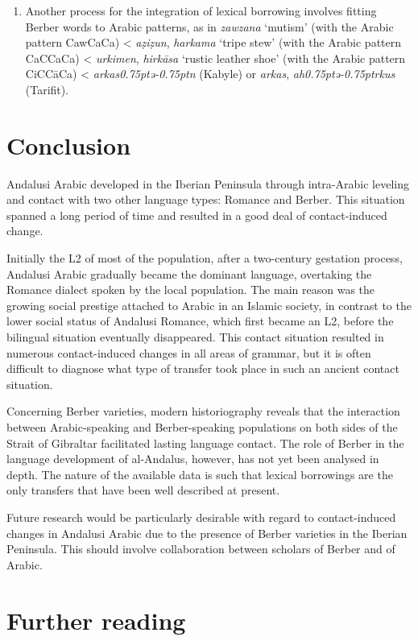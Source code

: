 \documentclass[output=paper,modfonts,nonflat]{langsci/langscibook}
\begin{document}
\begin{enumerate}
\item Another process for the integration of lexical borrowing involves fitting Berber words to Arabic patterns, as in \textit{zawzana} ‘mutism’ (with the Arabic pattern CawCaCa) < \textit{aẓiẓun}, \textit{harkama} ‘tripe stew’ (with the Arabic pattern CaCCaCa) < \textit{urkimen}, \textit{hirkāsa} ‘rustic leather shoe’ (with the Arabic pattern CiCCāCa) < \textit{arkas\kern 0.75ptǝ\kern -0.75ptn} (Kabyle) or \textit{arkas}, \textit{ah\kern 0.75ptǝ\kern -0.75ptrkus} (Tarifit).
\end{enumerate}


\section{Conclusion}


Andalusi Arabic developed in the Iberian Peninsula through intra-Arabic leveling and contact with two other language types: Romance and Berber. This situation spanned a long period of time and resulted in a good deal of contact-induced change. 

Initially the L2 of most of the population, after a two-century gestation process, Andalusi Arabic gradually became the dominant language, overtaking the Romance dialect spoken by the local population. The main reason was the growing social prestige attached to Arabic in an Islamic society, in contrast to the lower social status of Andalusi Romance, which first became an L2, before the bilingual situation eventually disappeared. This contact situation resulted in numerous contact-induced changes in all areas of grammar, but it is often difficult to diagnose what type of transfer took place in such an ancient contact situation. 

Concerning Berber varieties, modern historiography reveals that the interaction between Arabic-speaking and Berber-speaking populations on both sides of the Strait of Gibraltar facilitated lasting language contact. The role of Berber in the language development of al-Andalus, however, has not yet been analysed in depth. The nature of the available data is such that lexical borrowings are the only transfers that have been well described at present. 

Future research would be particularly desirable with regard to contact-induced changes in Andalusi Arabic due to the presence of Berber varieties in the Iberian Peninsula. This should involve collaboration between scholars of Berber and of Arabic. 

\section*{Further reading}
\end{document}
